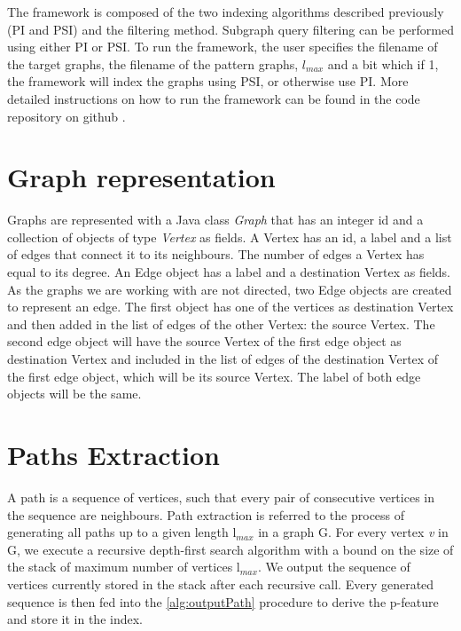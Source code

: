 \documentclass{l4proj}
\begin{document}
    

The framework is composed of the two indexing algorithms described previously (PI and PSI) and the filtering method. Subgraph query filtering can be performed using either PI or PSI. To run the framework, the user specifies the filename of the target graphs, the filename of the pattern graphs, $l_{max}$ and a bit which if 1, the framework will index the graphs using PSI, or otherwise use PI. More detailed instructions on how to run the framework can be found in the code repository on github \cite{framework-github}.

\section{Graph representation}
\label{path-index:graph-representation}
Graphs are  represented with a Java class \emph{Graph} that has an integer id and a collection of objects of type \emph{Vertex} as fields. A Vertex has an id, a label and a list of edges that connect it to its neighbours. The number of edges a Vertex has equal to its degree. An Edge object has a label and a destination Vertex as fields. As the graphs we are working with are not directed, two Edge objects are created to represent an edge. The first object has one of the vertices as destination Vertex and then added in the list of edges of the other Vertex: the source Vertex. The second edge object will have the source Vertex of the first edge object as destination Vertex and included in the list of edges of the destination Vertex of the first edge object, which will be its source Vertex. The label of both edge objects will be the same.

\section{Paths Extraction}
\label{pathsExtraction}
A path is a sequence of vertices, such that every pair of consecutive vertices in the sequence are neighbours. Path extraction is referred to the process of generating all paths up to a given length l$_{max}$ in a graph G. For every vertex \emph{v} in G, we execute a recursive depth-first search algorithm with a bound on the size of the stack of maximum number of vertices l$_{max}$. We output the sequence of vertices currently stored in the stack after each recursive call. Every generated sequence is then fed into the \ref{alg:outputPath} procedure to derive the p-feature and store it in the index.
\end{document}
